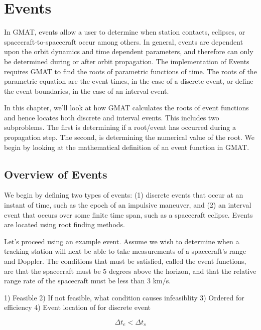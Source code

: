 \chapter{Events}  \label{Ch:UGEvents}


In GMAT, events allow a user to determine when 
station contacts, eclipses, or
spacecraft-to-spacecraft occur among others. In general, events are
dependent upon the orbit dynamics and  time dependent parameters,
and therefore can only be determined during or after orbit
propagation.  The implementation of Events requires GMAT to
find the roots of parametric functions of time.  The roots of the
parametric equation are the event times, in the case of a discrete event, or define
the event boundaries, in the case of an interval event.

In this chapter, we'll look at how GMAT calculates the roots of
event functions and hence locates both discrete and interval events. This includes two
subproblems.  The first is determining if a root/event has occurred during
a propagation step.  The second, is determining the numerical value
of the root.  We begin by looking at the
mathematical definition of an event function in GMAT.

\section{Overview of Events}

We begin by defining two types of events: (1) discrete events that occur at
an instant of time, such as the epoch of an impulsive maneuver, and (2) an interval
event that occurs over some finite time span, such as a spacecraft eclipse.  Events are located
using root finding methods.

Let's proceed using an example event.  Assume we wish to determine when a tracking station will next be able to take
measurements of a spacecraft's range and Doppler.  The conditions that must be satisfied, called the event functions,
are that the spacecraft must be 5 degrees above the horizon, and that the relative range rate of the spacecraft must be less than 3 km/s.

1)  Feasible
2)  If not feasible, what condition causes infeasiblity
3)  Ordered for efficiency
4)  Event location of for discrete event 

\begin{equation}
   \Delta t_e < \Delta t_s
\end{equation}

\label{sec:EventFunctionMathDef}

